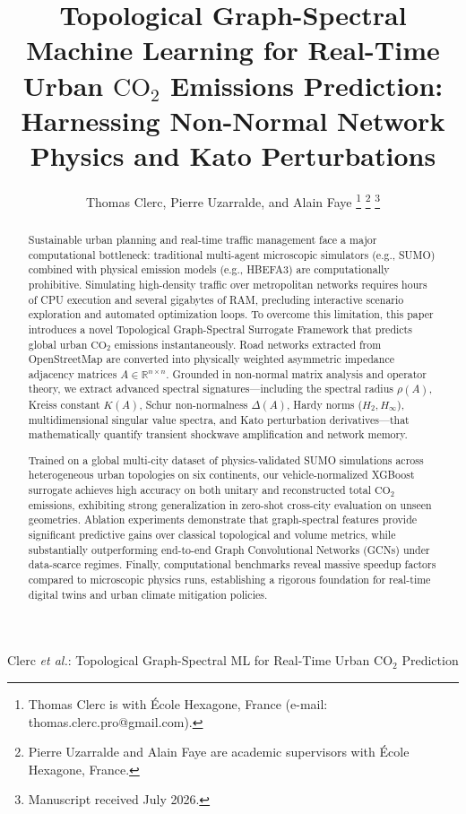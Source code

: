 \documentclass[lettersize,journal]{IEEEtran}
\begin{document}
\title{Topological Graph-Spectral Machine Learning for Real-Time Urban $\text{CO}_2$ Emissions Prediction: Harnessing Non-Normal Network Physics and Kato Perturbations}

\author{Thomas Clerc, Pierre Uzarralde, and Alain Faye
\thanks{Thomas Clerc is with École Hexagone, France (e-mail: thomas.clerc.pro@gmail.com).}%
\thanks{Pierre Uzarralde and Alain Faye are academic supervisors with École Hexagone, France.}%
\thanks{Manuscript received July 2026.}}

%
{Clerc \MakeLowercase{\textit{et al.}}: Topological Graph-Spectral ML for Real-Time Urban $\text{CO}_2$ Prediction}

\maketitle

\begin{abstract}
Sustainable urban planning and real-time traffic management face a major computational bottleneck: traditional multi-agent microscopic simulators (e.g., SUMO) combined with physical emission models (e.g., HBEFA3) are computationally prohibitive. Simulating high-density traffic over metropolitan networks requires hours of CPU execution and several gigabytes of RAM, precluding interactive scenario exploration and automated optimization loops. To overcome this limitation, this paper introduces a novel Topological Graph-Spectral Surrogate Framework that predicts global urban $\text{CO}_2$ emissions instantaneously. Road networks extracted from OpenStreetMap are converted into physically weighted asymmetric impedance adjacency matrices $A \in \mathbb{R}^{n \times n}$. Grounded in non-normal matrix analysis and operator theory, we extract advanced spectral signatures—including the spectral radius $\rho(A)$, Kreiss constant $K(A)$, Schur non-normalness $\Delta(A)$, Hardy norms ($H_2, H_\infty$), multidimensional singular value spectra, and Kato perturbation derivatives—that mathematically quantify transient shockwave amplification and network memory. 

Trained on a global multi-city dataset of physics-validated SUMO simulations across heterogeneous urban topologies on six continents, our vehicle-normalized XGBoost surrogate achieves high accuracy on both unitary and reconstructed total $\text{CO}_2$ emissions, exhibiting strong generalization in zero-shot cross-city evaluation on unseen geometries. Ablation experiments demonstrate that graph-spectral features provide significant predictive gains over classical topological and volume metrics, while substantially outperforming end-to-end Graph Convolutional Networks (GCNs) under data-scarce regimes. Finally, computational benchmarks reveal massive speedup factors compared to microscopic physics runs, establishing a rigorous foundation for real-time digital twins and urban climate mitigation policies.
\end{abstract}
\end{document}
